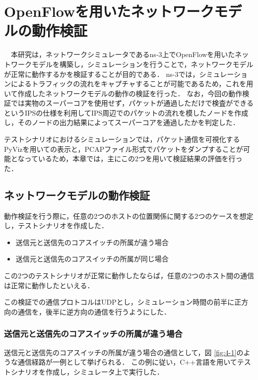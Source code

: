 \chapter{OpenFlowを用いたネットワークモデルの動作検証}

　本研究は，ネットワークシミュレータであるns-3上でOpenFlowを用いたネットワークモデルを構築し，シミュレーションを行うことで，ネットワークモデルが正常に動作するかを検証することが目的である．
ns-3では，シミュレーションによるトラフィックの流れをキャプチャすることが可能であるため，これを用いて作成したネットワークモデルの動作の検証を行った．
なお，今回の動作検証では実物のスーパーコアを使用せず，パケットが通過しただけで検査ができるというIPSの仕様を利用してIPS周辺でのパケットの流れを模したノードを作成し，そのノードの出力結果によってスーパーコアを通過したかを判定した．

テストシナリオにおけるシミュレーションでは，パケット通信を可視化するPyVizを用いての表示と，PCAPファイル形式でパケットをダンプすることが可能となっているため，本章では，主にこの2つを用いて検証結果の評価を行った．

\section{ネットワークモデルの動作検証}

動作検証を行う際に，任意の2つのホストの位置関係に関する2つのケースを想定し，テストシナリオを作成した．

\begin{itemize}
	\item 送信元と送信先のコアスイッチの所属が違う場合
	\item 送信元と送信先のコアスイッチの所属が同じ場合
\end{itemize}

この2つのテストシナリオが正常に動作したならば，任意の2つのホスト間の通信は正常に動作したといえる．

この検証での通信プロトコルはUDPとし，シミュレーション時間の前半に正方向の通信を，後半に逆方向の通信を行うようにした．

\subsection{送信元と送信先のコアスイッチの所属が違う場合}

送信元と送信先のコアスイッチの所属が違う場合の通信として，図 \ref{fig:4-1}のような通信経路が一例として挙げられる．
この例に従い，C++言語を用いてテストシナリオを作成し，シミュレータ上で実行した．

